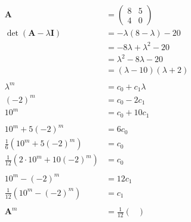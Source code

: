 \documentclass{article}
\begin{document}
\begin{align*}
  \mathbf{A}                              & = \begin{pmatrix}
                                                8 & 5 \\
                                                4 & 0
                                              \end{pmatrix}                                                   \\
  \det (\mathbf{A} - \lambda \mathbf{I})  & = -\lambda (8 - \lambda) - 20                                      \\
                                          & = -8 \lambda + \lambda^2 - 20                                      \\
                                          & = \lambda^2 - 8 \lambda - 20                                       \\
                                          & = (\lambda - 10) (\lambda + 2)                                     \\ \\
  \lambda^m                               & = c_0 + c_1 \lambda                                                \\
  (-2)^m                                  & = c_0 - 2 c_1                                                      \\
  10^m                                    & = c_0 + 10 c_1                                                     \\ \\
  10^m + 5 (-2)^m                         & = 6 c_0                                                            \\
  \frac{1}{6} (10^m + 5 (-2)^m)           & = c_0                                                              \\
  \frac{1}{12} (2 \cdot 10^m + 10 (-2)^m) & = c_0                                                              \\ \\
  10^m - (-2)^m                           & = 12 c_1                                                           \\
  \frac{1}{12} (10^m - (-2)^m)            & = c_1                                                              \\ \\
  \mathbf{A}^m                            & = \frac{1}{12} \begin{pmatrix}

\end{pmatrix}
\end{align*}
\end{document}
